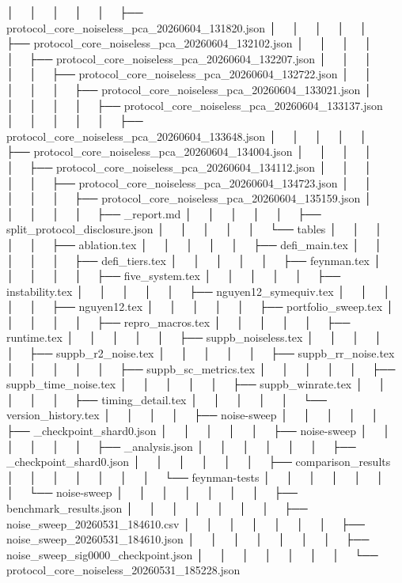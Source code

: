 │   │       │   │   │   ├── protocol_core_noiseless_pca_20260604_131820.json
│   │       │   │   │   ├── protocol_core_noiseless_pca_20260604_132102.json
│   │       │   │   │   ├── protocol_core_noiseless_pca_20260604_132207.json
│   │       │   │   │   ├── protocol_core_noiseless_pca_20260604_132722.json
│   │       │   │   │   ├── protocol_core_noiseless_pca_20260604_133021.json
│   │       │   │   │   ├── protocol_core_noiseless_pca_20260604_133137.json
│   │       │   │   │   ├── protocol_core_noiseless_pca_20260604_133648.json
│   │       │   │   │   ├── protocol_core_noiseless_pca_20260604_134004.json
│   │       │   │   │   ├── protocol_core_noiseless_pca_20260604_134112.json
│   │       │   │   │   ├── protocol_core_noiseless_pca_20260604_134723.json
│   │       │   │   │   ├── protocol_core_noiseless_pca_20260604_135159.json
│   │       │   │   │   ├── _report.md
│   │       │   │   │   ├── split_protocol_disclosure.json
│   │       │   │   │   └── tables
│   │       │   │   │       ├── ablation.tex
│   │       │   │   │       ├── defi_main.tex
│   │       │   │   │       ├── defi_tiers.tex
│   │       │   │   │       ├── feynman.tex
│   │       │   │   │       ├── five_system.tex
│   │       │   │   │       ├── instability.tex
│   │       │   │   │       ├── nguyen12_symequiv.tex
│   │       │   │   │       ├── nguyen12.tex
│   │       │   │   │       ├── portfolio_sweep.tex
│   │       │   │   │       ├── repro_macros.tex
│   │       │   │   │       ├── runtime.tex
│   │       │   │   │       ├── suppb_noiseless.tex
│   │       │   │   │       ├── suppb_r2_noise.tex
│   │       │   │   │       ├── suppb_rr_noise.tex
│   │       │   │   │       ├── suppb_sc_metrics.tex
│   │       │   │   │       ├── suppb_time_noise.tex
│   │       │   │   │       ├── suppb_winrate.tex
│   │       │   │   │       ├── timing_detail.tex
│   │       │   │   │       └── version_history.tex
│   │       │   │   ├── noise-sweep
│   │       │   │   │   ├── _checkpoint_shard0.json
│   │       │   │   │   ├── noise-sweep
│   │       │   │   │   │   ├── _analysis.json
│   │       │   │   │   │   ├── _checkpoint_shard0.json
│   │       │   │   │   │   ├── comparison_results
│   │       │   │   │   │   │   └── feynman-tests
│   │       │   │   │   │   │       └── noise-sweep
│   │       │   │   │   │   │           ├── benchmark_results.json
│   │       │   │   │   │   │           ├── noise_sweep_20260531_184610.csv
│   │       │   │   │   │   │           ├── noise_sweep_20260531_184610.json
│   │       │   │   │   │   │           ├── noise_sweep_sig0000_checkpoint.json
│   │       │   │   │   │   │           └── protocol_core_noiseless_20260531_185228.json
